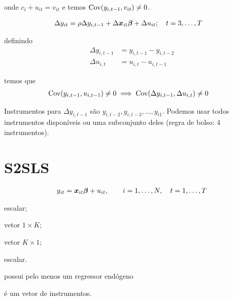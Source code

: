 \documentclass[11pt, oneside, a4paper, article]{article}
\numberwithin{equation}{section}
\begin{document}
\begin{description}
\noindent
onde $c_{i} + u_{it} = v_{it}$ e temos $\text{Cov}(y_{i,t-1}, v_{it}) \neq 0$.

\vspace{-1 em}
\begin{align*}
\Delta y_{it} &= \rho \Delta y_{i,t-1} + \Delta \boldsymbol{x}_{it} \boldsymbol{\beta} + \Delta u_{it}; 
\quad t=3, \dots, T
\end{align*}

\noindent
definindo
\begin{align*}
\Delta y_{i, t-1} &= y_{i, t-1} - y_{i, t-2}
\\
\Delta u_{i, t} &= u_{i, t} - u_{i, t-1}
\end{align*}

\noindent
temos que
\begin{align*}
\text{Cov}(y_{i,t-1}, u_{i,t-1}) & \neq 0 \implies 
\text{Cov}(\Delta y_{i, t-1}, \Delta u_{i,t}) \neq 0 
\end{align*}

Instrumentos para $\Delta y_{i,t-1}$ são $y_{i,t-2}, y_{i,t-3}, \dots, y_{i1}$.
Podemos usar todos instrumentos disponíveis ou uma subconjunto deles 
(regra de bolso: 4 instrumentos).

\clearpage
\section{S2SLS}

\vspace{-2 em}
\begin{align*}
y_{it} = \boldsymbol{x}_{it}\boldsymbol{\beta} + u_{it}, 
\qquad i = 1, \dots, N, \quad t = 1, \dots, T
\end{align*}

\begin{description}[noitemsep]
	\item [$y_{it}$] escalar;
	\item [$\xvec_{it}$]  vetor $1 \times K$;
	\item [$\betavec$] vetor $K \times 1$;
	\item [$u_{it}$] escalar.
\end{description}

\begin{description}[noitemsep]
	\item [$\xvec_{it}$]  possui pelo menos um regressor endógeno
	\item [$\zvec_{it}$]  é um vetor de instrumentos.
\end{description}


\end{description}
\end{document}
